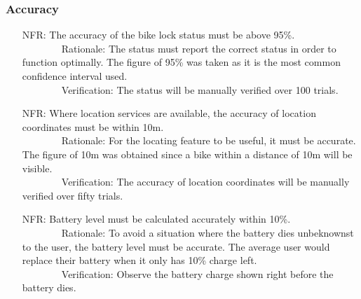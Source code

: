 \documentclass[12pt]{article}
\newcounter{nfrnum} %
\begin{document}
\subsubsection{Accuracy}
\begin{itemize}
\setlength{\itemindent}{.5in}
\item[NFR\refstepcounter{nfrnum}\thenfrnum\label{NFRAccuracyStatus}:] The accuracy of the bike lock status must be above 95\%.
\\ \-\ \-\ \-\ \-\ \-\ \-\ \-\ \-\ Rationale: The status must report the correct status in order to function optimally. The figure of 95\% was taken as it is the most common confidence interval used. 
\\ \-\ \-\ \-\ \-\ \-\ \-\ \-\ \-\ Verification: The status will be manually verified over 100 trials. 
\item[NFR\refstepcounter{nfrnum}\thenfrnum\label{NFRAccuracyPos}:] Where location services are available, the accuracy of location coordinates must be within 10m.
\\ \-\ \-\ \-\ \-\ \-\ \-\ \-\ \-\ Rationale: For the locating feature to be useful, it must be accurate. The figure of 10m was obtained since a bike within a distance of 10m will be visible. 
\\ \-\ \-\ \-\ \-\ \-\ \-\ \-\ \-\ Verification: The accuracy of location coordinates will be manually verified over fifty trials. 
\item[NFR\refstepcounter{nfrnum}\thenfrnum\label{NFRBatteryLevel}:] Battery level must be calculated accurately within 10\%.
\\ \-\ \-\ \-\ \-\ \-\ \-\ \-\ \-\ Rationale: To avoid a situation where the battery dies unbeknownst to the user, the battery level must be accurate. The average user would replace their battery when it only has 10\% charge left.
\\ \-\ \-\ \-\ \-\ \-\ \-\ \-\ \-\ Verification: Observe the battery charge shown right before the battery dies. 
\end{itemize}
\end{document}
